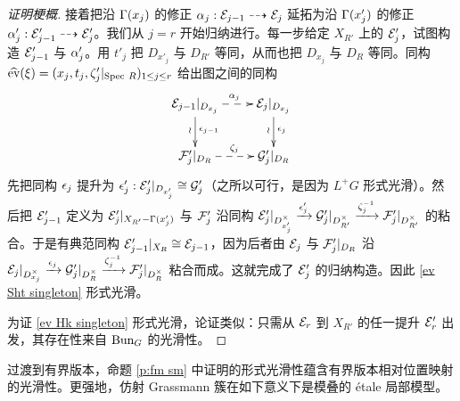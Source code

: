 \begin{proof}[证明梗概]
接着把沿 $\Gamma(x_{j})$ 的修正 $\alpha_{j}: \mathcal{E}_{j-1}\dashrightarrow\mathcal{E}_{j}$ 延拓为沿 $\Gamma(x'_{j})$ 的修正 $\alpha'_{j}: \mathcal{E}'_{j-1}\dashrightarrow\mathcal{E}'_{j}$。我们从 $j=r$ 开始归纳进行。每一步给定 $X_{R'}$ 上的 $\mathcal{E}'_{j}$，试图构造 $\mathcal{E}'_{j-1}$ 与 $\alpha'_{j}$。用 $t'_{j}$ 把 $D_{x'_{j}}$ 与 $D_{R'}$ 等同，从而也把 $D_{x_{j}}$ 与 $D_{R}$ 等同。同构 $\widehat{\textup{ev}}(\xi)=(x_{j}, t_{j},\zeta'_{j}|_{\textup{Spec}\  R})_{1\le j\le r}$ 给出图之间的同构
\begin{equation*}
\xymatrix{\cE_{j-1}|_{D_{x_{j}}}\ar[d]^{\e_{j-1}}_{\wr}\ar@{-->}[r]^{\a_{j}} & \cE_{j}|_{D_{x_{j}}}\ar[d]^{\e_{j}}_{\wr}\\
\cF'_{j}|_{D_{R}}\ar@{-->}[r]^{\z_{j}} & \cG'_{j}|_{D_{R}}
}
\end{equation*}
先把同构 $\epsilon_{j}$ 提升为 $\epsilon'_{j}: \mathcal{E}'_{j}|_{D_{x'_{j}}}\cong \mathcal{G}'_{j}$（之所以可行，是因为 $L^{+}G$ 形式光滑）。然后把 $\mathcal{E}'_{j-1}$ 定义为 $\mathcal{E}'_{j}|_{X_{R'}-\Gamma(x'_{j})}$ 与 $\mathcal{F}'_{j}$ 沿同构 $\mathcal{E}'_{j}|_{D^{\times}_{x'_{j}}}\xrightarrow{\epsilon'_{j}} \mathcal{G}'_{j}|_{D^{\times}_{R'}}\xrightarrow{\zeta_{j}^{-1}}\mathcal{F}'_{j}|_{D^{\times}_{R'}}$ 的粘合。于是有典范同构 $\mathcal{E}'_{j-1}|_{X_{R}}\cong \mathcal{E}_{j-1}$，因为后者由 $\mathcal{E}_{j}$ 与 $\mathcal{F}'_{j}|_{D_{R}}$ 沿 $\mathcal{E}_{j}|_{D^{\times}_{x_{j}}}\xrightarrow{\epsilon_{j}}\mathcal{G}'_{j}|_{D^{\times}_{R}}\xrightarrow{\zeta_{j}^{-1}}\mathcal{F}'_{j}|_{D^{\times}_{R}}$ 粘合而成。这就完成了 $\mathcal{E}'_{j}$ 的归纳构造。因此 \eqref{ev Sht singleton} 形式光滑。

为证 \eqref{ev Hk singleton} 形式光滑，论证类似：只需从 $\mathcal{E}_{r}$ 到 $X_{R'}$ 的任一提升 $\mathcal{E}'_{r}$ 出发，其存在性来自 $\textup{Bun}_{G}$ 的光滑性。
\end{proof}

过渡到有界版本，命题 \ref{p:fm sm} 中证明的形式光滑性蕴含有界版本相对位置映射的光滑性。更强地，仿射 Grassmann 簇在如下意义下是模叠的 étale 局部模型。

